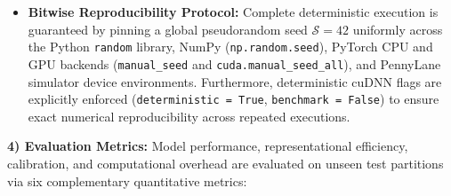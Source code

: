 \documentclass[journal]{IEEEtran}
\begin{document}
\begin{itemize}
    \item \textbf{Bitwise Reproducibility Protocol:} Complete deterministic execution is guaranteed by pinning a global pseudorandom seed $\mathcal{S} = 42$ uniformly across the Python \texttt{random} library, NumPy (\texttt{np.random.seed}), PyTorch CPU and GPU backends (\texttt{manual\_seed} and \texttt{cuda.manual\_seed\_all}), and PennyLane simulator device environments. Furthermore, deterministic cuDNN flags are explicitly enforced (\texttt{deterministic = True}, \texttt{benchmark = False}) to ensure exact numerical reproducibility across repeated executions.
\end{itemize}

\textbf{4) Evaluation Metrics:}
Model performance, representational efficiency, calibration, and computational overhead are evaluated on unseen test partitions via six complementary quantitative metrics:
\end{document}
